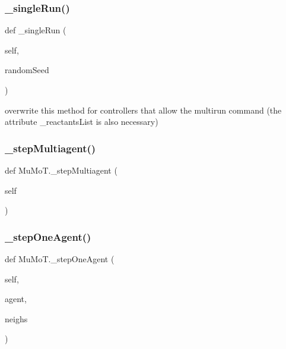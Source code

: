 \mbox{\label{namespace_mu_mo_t_a51d421aacb4cd83af5f1c2e60c3dff9c}} 
\subsubsection{\texorpdfstring{\+\_\+single\+Run()}{\_singleRun()}}
{\footnotesize\ttfamily def \+\_\+single\+Run (\begin{DoxyParamCaption}\item[{}]{self,  }\item[{}]{random\+Seed }\end{DoxyParamCaption})\hspace{0.3cm}{\ttfamily [private]}}



overwrite this method for controllers that allow the \textquotesingle{}multirun\textquotesingle{} command (the attribute \+\_\+reactants\+List is also necessary) 

\mbox{\label{namespace_mu_mo_t_a07410c9e089705e695091a2277184f0c}} 
\subsubsection{\texorpdfstring{\+\_\+step\+Multiagent()}{\_stepMultiagent()}}
{\footnotesize\ttfamily def Mu\+Mo\+T.\+\_\+step\+Multiagent (\begin{DoxyParamCaption}\item[{}]{self }\end{DoxyParamCaption})\hspace{0.3cm}{\ttfamily [private]}}

\mbox{\label{namespace_mu_mo_t_aee57d4dc31ddc1a90dea8f3405deb144}} 
\subsubsection{\texorpdfstring{\+\_\+step\+One\+Agent()}{\_stepOneAgent()}}
{\footnotesize\ttfamily def Mu\+Mo\+T.\+\_\+step\+One\+Agent (\begin{DoxyParamCaption}\item[{}]{self,  }\item[{}]{agent,  }\item[{}]{neighs }\end{DoxyParamCaption})\hspace{0.3cm}{\ttfamily [private]}}

